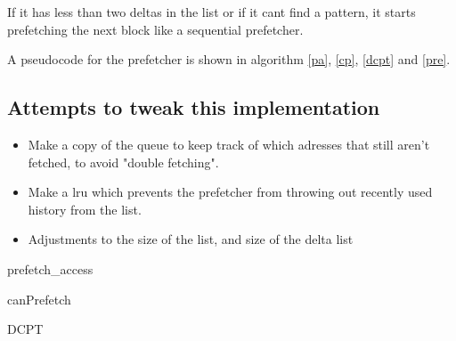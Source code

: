 \documentclass[12pt,journal,compsoc]{IEEEtran}
\begin{document}
If it has less than two deltas in the list or if it cant find a pattern, it starts prefetching the next block like a sequential prefetcher.

A pseudocode for the prefetcher is shown in algorithm \ref{pa}, \ref{cp}, \ref{dcpt} and \ref{pre}.
\subsection{Attempts to tweak this implementation}
\begin{itemize}
\item Make a copy of the queue to keep track of which adresses that still aren't fetched, to avoid "double fetching".
\item Make a lru which prevents the prefetcher from throwing out recently used history from the list.
\item Adjustments to the size of the list, and size of the delta list
\end{itemize}

\begin{algorithm}
\dontprintsemicolon
{}

\caption{prefetch\_access\label{pa}}
\end{algorithm}

\begin{algorithm}
\dontprintsemicolon
{}

\caption{canPrefetch\label{cp}}
\end{algorithm}

\begin{algorithm}
\dontprintsemicolon
{}

\caption{DCPT\label{dcpt}}
\end{algorithm}
\end{document}

